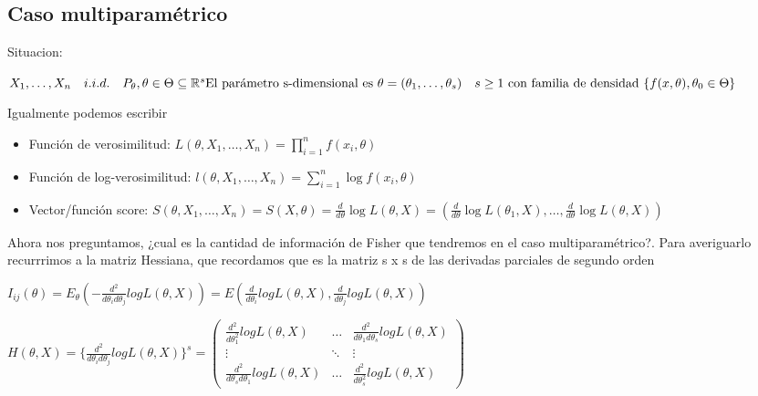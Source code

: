 \setlength{\parskip}{1em}

\subsection{Caso multiparamétrico}

Situacion:

\(
X_1,\dots,X_n \quad i.i.d. \quad P_\theta,\theta \in \Theta \subseteq \mathbb{R}^s 
\\ \text{El parámetro s-dimensional es } \theta = (\theta_1,\dots,\theta_s) \quad s \geq 1
\\ \text{ con familia de densidad }\{ f(x,\theta),\theta_0 \in \Theta\}
\)

Igualmente podemos escribir

\begin{itemize}
    \item Función de verosimilitud: $L(\theta,X_1,\dots,X_n)=\prod^{n}_{i=1} f(x_i,\theta)$
    \item Función de log-verosimilitud: $l(\theta,X_1,\dots,X_n)=\sum^{n}_{i=1} \log f(x_i,\theta)$
    \item Vector/función score: $S(\theta,X_1,\dots,X_n)=S(X,\theta)=\frac{d}{d \theta} \log L(\theta,X)
    = (\frac{d}{d \theta} \log L(\theta_1,X),\dots,\frac{d}{d \theta} \log L(\theta,X))$
\end{itemize}

Ahora nos preguntamos, ¿cual es la cantidad de información de Fisher que tendremos en el caso multiparamétrico?.
Para averiguarlo recurrrimos a la matriz Hessiana, que recordamos que es la matriz s x s de las derivadas parciales de segundo orden

\(
I_{ij}(\theta)=E_\theta(-\frac{d^2}{d \theta_i d \theta_j} log L(\theta,X))
=E(\frac{d}{d \theta_i} log L(\theta,X),\frac{d}{d \theta_j} log L(\theta,X))
\)

\(
H(\theta,X)=\{ \frac{d^2}{d \theta_i d \theta_j}log L(\theta,X) \}^s 
=
\begin{pmatrix}
    \frac{d^2}{d \theta_1^2}log L(\theta,X) & \dots & \frac{d^2}{d \theta_1 d \theta_s}log L(\theta,X) \\
    \vdots & \ddots & \vdots \\
    \frac{d^2}{d \theta_s d \theta_1}log L(\theta,X) & \dots & \frac{d^2}{d \theta_s^2}log L(\theta,X)
\end{pmatrix}
\)

